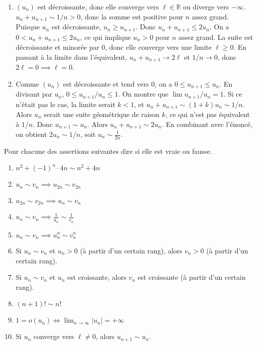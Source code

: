\documentclass[solutions]{exercices}
\begin{document}
\begin{solution}
	\begin{enumerate}
		\item $(u_n)$ est décroissante, donc elle converge vers $\ell \in \mathbb{R}$ ou diverge vers $-\infty$.
		      $u_n+u_{n+1} \sim 1/n > 0$, donc la somme est positive pour $n$ assez grand.
		      Puisque $u_n$ est décroissante, $u_n \ge u_{n+1}$. Donc $u_n+u_{n+1} \le 2u_n$.
		      On a $0 < u_n+u_{n+1} \le 2u_n$, ce qui implique $u_n > 0$ pour $n$ assez grand.
		      La suite est décroissante et minorée par 0, donc elle converge vers une limite $\ell \ge 0$.
		      En passant à la limite dans l'équivalent, $u_n+u_{n+1} \to 2\ell$ et $1/n \to 0$, donc $2\ell = 0 \implies \ell=0$.
		\item Comme $(u_n)$ est décroissante et tend vers 0, on a $0 \le u_{n+1} \le u_n$. En divisant par $u_n$, $0 \le u_{n+1}/u_n \le 1$.
		      On montre que $\lim u_{n+1}/u_n=1$. Si ce n'était pas le cas, la limite serait $k<1$, et $u_n+u_{n+1}\sim(1+k)u_n \sim 1/n$. Alors $u_n$ serait une suite géométrique de raison $k$, ce qui n'est pas équivalent à $1/n$.
		      Donc $u_{n+1} \sim u_n$. Alors $u_n+u_{n+1} \sim 2u_n$.
		      En combinant avec l'énoncé, on obtient $2u_n \sim 1/n$, soit $u_n \sim \frac{1}{2n}$.
	\end{enumerate}
\end{solution}

\begin{exercice}
	Pour chacune des assertions suivantes dire si elle est vraie ou fausse.
	\begin{enumerate}
		\item $n^2+(-1)^n\cdot 4n \sim n^2+4n$
		\item $u_n\sim v_n \implies u_{2n}\sim v_{2n}$
		\item $u_{2n}\sim v_{2n} \implies u_n\sim v_n$
		\item $u_n\sim v_n \implies \frac{1}{u_{n}}\sim \frac{1}{v_{n}}$
		\item $u_n\sim v_n \implies u_{n}^n\sim v_{n}^n$
		\item Si $u_n\sim v_n$ et $u_n>0$ (à partir d'un certain rang), alors $v_n>0$ (à partir d'un certain rang).
		\item Si $u_n\sim v_n$ et $u_n$ est croissante, alors $v_n$ est croissante (à partir d'un certain rang).
		\item $(n+1)! \sim n !$
		\item $1=o(u_n) \iff \lim_{n\to\infty} |u_n|=+\infty$
		\item Si $u_n$ converge vers $\ell \ne 0$, alors $u_{n+1}\sim u_n$.
	\end{enumerate}
\end{exercice}
\end{document}
